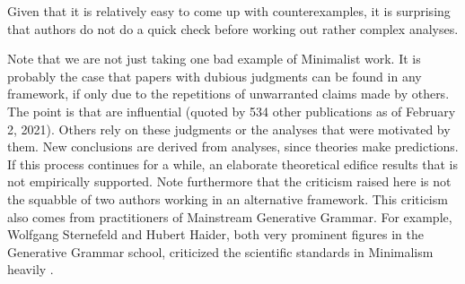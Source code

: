 \documentclass[output=paper
 	        ,biblatex
                ,babelshorthands
                ,newtxmath
                ,draftmode
                ,colorlinks, citecolor=brown
]{langscibook}
\begin{document}
\zl
%
Given that it is relatively easy to come up with counterexamples, it is surprising that authors do
not do a quick check before working out rather complex analyses.

Note that we are not just taking one bad example of Minimalist work. It is probably the case that
papers with dubious judgments can be found in any framework, if only due to the repetitions
of unwarranted claims made by others. The point is that \citeauthor{AL2003a-u} are influential 
(quoted by 534 other publications as of February 2, 2021). 
Others rely on these judgments or the analyses that were
motivated by them. New conclusions are derived from analyses, since theories make predictions. If
this process continues for a while, an elaborate theoretical edifice results that is not
empirically supported. Note furthermore that the criticism raised here is not the squabble of two
authors working in an alternative framework. This criticism also comes from practitioners of
Mainstream Generative Grammar. For example, Wolfgang Sternefeld and Hubert Haider, both very
prominent figures in the  Generative Grammar school, criticized the scientific standards in
Minimalism heavily \citep{%
SR2012a,Haider2018a}. 
\end{document}
